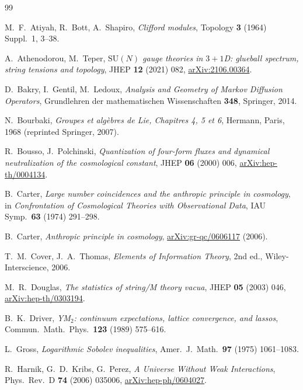 \documentclass[11pt,reqno]{amsart}
\theoremstyle{plain}
\theoremstyle{definition}
\theoremstyle{remark}
\begin{document}
\begin{thebibliography}{99}

M.~F.~Atiyah, R.~Bott, A.~Shapiro,
\emph{Clifford modules},
Topology \textbf{3} (1964) Suppl.\ 1, 3--38.

A.~Athenodorou, M.~Teper,
\emph{$\mathrm{SU}(N)$ gauge theories in $3+1$D: glueball spectrum, string tensions and topology},
JHEP \textbf{12} (2021) 082,
\href{https://arxiv.org/abs/2106.00364}{arXiv:2106.00364}.

D.~Bakry, I.~Gentil, M.~Ledoux,
\emph{Analysis and Geometry of Markov Diffusion Operators},
Grundlehren der mathematischen Wissenschaften \textbf{348}, Springer, 2014.

N.~Bourbaki,
\emph{Groupes et alg\`ebres de Lie, Chapitres 4, 5 et 6},
Hermann, Paris, 1968 (reprinted Springer, 2007).

R.~Bousso, J.~Polchinski,
\emph{Quantization of four-form fluxes and dynamical neutralization of the cosmological constant},
JHEP \textbf{06} (2000) 006,
\href{https://arxiv.org/abs/hep-th/0004134}{arXiv:hep-th/0004134}.

B.~Carter,
\emph{Large number coincidences and the anthropic principle in cosmology},
in \emph{Confrontation of Cosmological Theories with Observational Data}, IAU Symp.\ \textbf{63} (1974) 291--298.

B.~Carter,
\emph{Anthropic principle in cosmology},
\href{https://arxiv.org/abs/gr-qc/0606117}{arXiv:gr-qc/0606117} (2006).

T.~M.~Cover, J.~A.~Thomas,
\emph{Elements of Information Theory}, 2nd ed.,
Wiley-Interscience, 2006.

M.~R.~Douglas,
\emph{The statistics of string/M theory vacua},
JHEP \textbf{05} (2003) 046,
\href{https://arxiv.org/abs/hep-th/0303194}{arXiv:hep-th/0303194}.

B.~K.~Driver,
\emph{YM$_2$: continuum expectations, lattice convergence, and lassos},
Commun.\ Math.\ Phys.\ \textbf{123} (1989) 575--616.

L.~Gross,
\emph{Logarithmic Sobolev inequalities},
Amer.\ J.\ Math.\ \textbf{97} (1975) 1061--1083.

R.~Harnik, G.~D.~Kribs, G.~Perez,
\emph{A Universe Without Weak Interactions},
Phys.\ Rev.\ D \textbf{74} (2006) 035006,
\href{https://arxiv.org/abs/hep-ph/0604027}{arXiv:hep-ph/0604027}.


\end{thebibliography}
\end{document}

